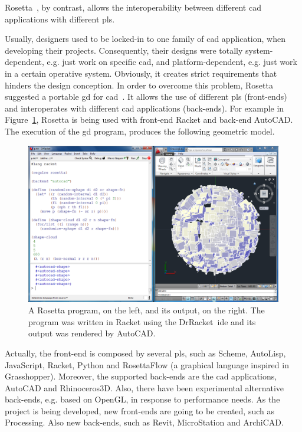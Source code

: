 Rosetta~\cite{lopes2011portable}, by contrast, allows the interoperability between different \ac{cad} applications with different \ac{pl}s. 

Usually, designers used to be locked-in to one family of \ac{cad} application, when developing their projects. Consequently, their designs were totally system-dependent, e.g. just work on specific \ac{cad}, and platform-dependent, e.g. just work in a certain operative system. Obviously, it creates strict requirements that hinders the design conception. In order to overcome this problem, Rosetta suggested a portable \ac{gd} for \ac{cad}~\cite{lopes2011portable}. It allows the use of different \ac{pl}s (front-ends) and interoperates with different \ac{cad} applications (back-ends). For example in Figure~\ref{fig:rosetta1}, Rosetta is being used with front-end Racket and back-end AutoCAD. The execution of the \ac{gd} program, produces the following geometric model.

\begin{figure}[!htbp]
  \centering
  \includegraphics[scale=0.2]{img/rosetta1}
    \caption{A Rosetta program, on the left, and its output, on the right. The program was written in Racket using the DrRacket~\ac{ide} and its output was rendered by AutoCAD.}  
  \label{fig:rosetta1}
\end{figure} 

Actually, the front-end is composed by several \ac{pl}s, such as Scheme, AutoLisp, JavaScript, Racket, Python and RosettaFlow (a graphical language inspired in Grasshopper). Moreover, the supported back-ends are the \ac{cad} applications, AutoCAD and Rhinoceros3D. Also, there have been experimental alternative back-ends, e.g. based on OpenGL, in response to performance needs. As the project is being developed, new front-ends are going to be created, such as Processing. Also new back-ends, such as Revit, MicroStation and ArchiCAD.

